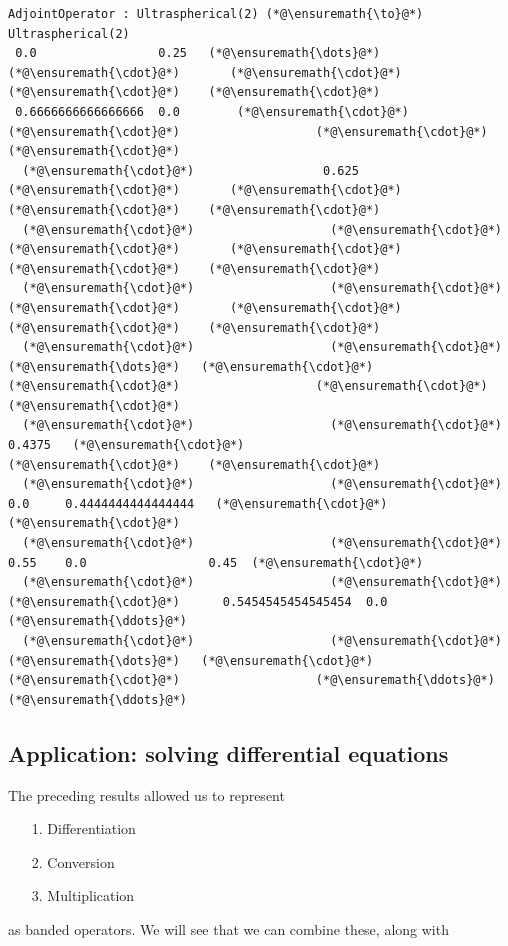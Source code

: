 \documentclass[12pt,a4paper]{article}
\begin{document}
\begin{lstlisting}
AdjointOperator : Ultraspherical(2) (*@\ensuremath{\to}@*) Ultraspherical(2)
 0.0                 0.25   (*@\ensuremath{\dots}@*)   (*@\ensuremath{\cdot}@*)       (*@\ensuremath{\cdot}@*)                   (*@\ensuremath{\cdot}@*)    (*@\ensuremath{\cdot}@*)
 0.6666666666666666  0.0        (*@\ensuremath{\cdot}@*)       (*@\ensuremath{\cdot}@*)                   (*@\ensuremath{\cdot}@*)    (*@\ensuremath{\cdot}@*)
  (*@\ensuremath{\cdot}@*)                  0.625      (*@\ensuremath{\cdot}@*)       (*@\ensuremath{\cdot}@*)                   (*@\ensuremath{\cdot}@*)    (*@\ensuremath{\cdot}@*)
  (*@\ensuremath{\cdot}@*)                   (*@\ensuremath{\cdot}@*)         (*@\ensuremath{\cdot}@*)       (*@\ensuremath{\cdot}@*)                   (*@\ensuremath{\cdot}@*)    (*@\ensuremath{\cdot}@*)
  (*@\ensuremath{\cdot}@*)                   (*@\ensuremath{\cdot}@*)         (*@\ensuremath{\cdot}@*)       (*@\ensuremath{\cdot}@*)                   (*@\ensuremath{\cdot}@*)    (*@\ensuremath{\cdot}@*)
  (*@\ensuremath{\cdot}@*)                   (*@\ensuremath{\cdot}@*)     (*@\ensuremath{\dots}@*)   (*@\ensuremath{\cdot}@*)       (*@\ensuremath{\cdot}@*)                   (*@\ensuremath{\cdot}@*)    (*@\ensuremath{\cdot}@*)
  (*@\ensuremath{\cdot}@*)                   (*@\ensuremath{\cdot}@*)        0.4375   (*@\ensuremath{\cdot}@*)                   (*@\ensuremath{\cdot}@*)    (*@\ensuremath{\cdot}@*)
  (*@\ensuremath{\cdot}@*)                   (*@\ensuremath{\cdot}@*)        0.0     0.4444444444444444   (*@\ensuremath{\cdot}@*)    (*@\ensuremath{\cdot}@*)
  (*@\ensuremath{\cdot}@*)                   (*@\ensuremath{\cdot}@*)        0.55    0.0                 0.45  (*@\ensuremath{\cdot}@*)
  (*@\ensuremath{\cdot}@*)                   (*@\ensuremath{\cdot}@*)         (*@\ensuremath{\cdot}@*)      0.5454545454545454  0.0   (*@\ensuremath{\ddots}@*)
  (*@\ensuremath{\cdot}@*)                   (*@\ensuremath{\cdot}@*)     (*@\ensuremath{\dots}@*)   (*@\ensuremath{\cdot}@*)       (*@\ensuremath{\cdot}@*)                   (*@\ensuremath{\ddots}@*)    (*@\ensuremath{\ddots}@*)
\end{lstlisting}


\subsection{Application: solving differential equations}
The preceding results allowed us to represent 

\begin{itemize}
\item[1. ] Differentiation


\item[2. ] Conversion


\item[3. ] Multiplication

\end{itemize}
as banded operators. We will see that we can combine these, along with 
\end{document}

